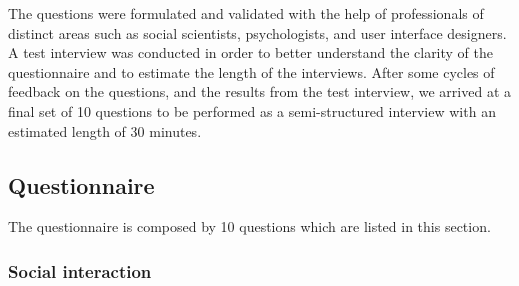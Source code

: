 \documentclass{sigchi}
\begin{document}
The questions were formulated and validated with the help of professionals of distinct areas such as social scientists, psychologists, and user interface designers.  A test interview was conducted in order to better understand the clarity of the questionnaire and to estimate the length of the interviews. After some cycles of feedback on the questions, and the results from the test interview, we arrived at a final set of 10 questions to be performed as a semi-structured interview with an estimated length of 30 minutes. 

\subsection{Questionnaire}
The questionnaire is composed by 10 questions which are listed in this section.

\subsubsection{Social interaction}
\end{document}
